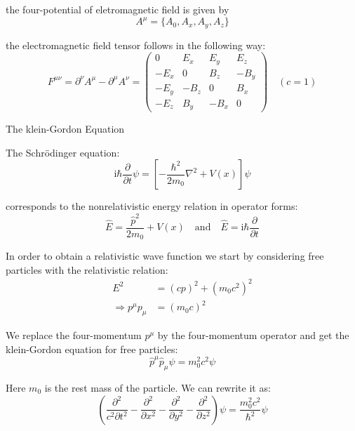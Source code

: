 the four-potential of eletromagnetic field is given by
\begin{equation}
A^\mu = \{A_0, A_x, A_y, A_z\}
\end{equation}

the electromagnetic field tensor follows in the following way:
\begin{equation}
F^{\mu\nu} = \partial^\nu A^\mu - \partial^\mu A^\nu = \begin{pmatrix} 0 & E_x & E_y & E_z \\ -E_x & 0 & B_z & -B_y \\ -E_y & -B_z & 0 & B_x \\ -E_z & B_y & -B_x & 0 \end{pmatrix} \quad (c=1)
\end{equation}

The klein-Gordon Equation

The Schrödinger equation:
\begin{equation}
\mathrm{i}\hbar \frac{\partial}{\partial t} \psi = \left[ -\frac{\hbar^2}{2m_0} \nabla^2 + V(x) \right] \psi
\end{equation}

corresponds to the nonrelativistic energy relation in operator forms:
\begin{equation}
\hat{E} = \frac{\hat{p}^2}{2m_0} + V(x) \quad \text{and} \quad \hat{E} = \mathrm{i}\hbar \frac{\partial}{\partial t}
\end{equation}

In order to obtain a relativistic wave function we start by considering free particles with the relativistic relation:
\begin{equation}
\begin{aligned}
E^2 &= (cp)^2 + (m_0 c^2)^2 \\
\Rightarrow p^\mu p_\mu &= (m_0 c)^2
\end{aligned}
\end{equation}

We replace the four-momentum $p^\mu$ by the four-momentum operator and get the klein-Gordon equation for free particles:
\begin{equation}
\hat{p}^\mu \hat{p}_\mu \psi = m_0^2 c^2 \psi
\end{equation}

Here $m_0$ is the rest mass of the particle. We can rewrite it as:
\begin{equation}
\left( \frac{\partial^2}{c^2 \partial t^2} - \frac{\partial^2}{\partial x^2} - \frac{\partial^2}{\partial y^2} - \frac{\partial^2}{\partial z^2} \right) \psi = \frac{m_0^2 c^2}{\hbar^2} \psi
\end{equation}

